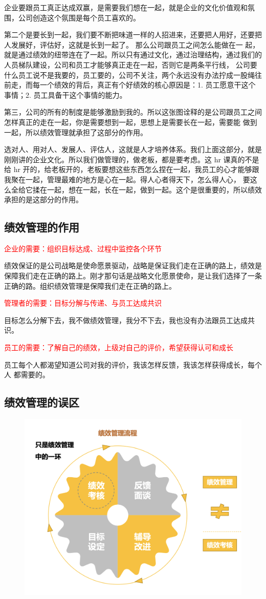 \documentclass[12pt]{article}
\begin{document}
企业要跟员工真正达成双赢，是需要我们想在一起，就是企业的文化价值观和氛围，公司创造这个氛围是每个员工喜欢的。

第二个是要长到一起，我们要不断把味道一样的人招进来，还要把人用好，还要把人发展好，评估好，这就是长到一起了。 那么公司跟员工之间怎么能做在一 起，就是通过绩效的纽带连在了一起。所以只有通过文化，通过治理结构，通过我们的人员梯队建设，公司和员工才能够真正走在一起，否则它是两条平行线， 公司要什么员工说不是我要的，员工要的，公司不关注，两个永远没有办法拧成一股绳往前走，而每一个绩效的背后，真正有个好绩效的核心原因是：1. 员工愿意干这个事情；2. 员工具备干这个事情的能力。

第三，公司的所有的制度是能够激励到我的。所以这张图诠释的是公司跟员工之间怎样真正的走在一起，你是需要想到一起，思想上是需要长在一起，需要能 做到一起，所以绩效管理就承担了这部分的作用。

选对人、用对人、发展人、评估人，这就是人才培养体系。我们上面这部分，就是刚刚讲的企业文化。所以我们做管理的，做老板，都是要考虑。这 hr 课真的不是给 hr 开的，给老板开的，老板要想这些东西怎么捏在一起，我员工的心才能够跟我聚在一起，管理最难的地方是心在一起。得人心者得天下，怎么得人心， 要这么全给它揉在一起，想在一起，长在一起，做到一起。这个是很重要的，所以绩效承担的是这部分的作用。

\subsection{绩效管理的作用}
\textcolor{red}{企业的需要：组织目标达成、过程中监控各个环节}

绩效保证的是公司战略是使命愿景驱动，战略是保证我们走在正确的路上，绩效是保障我们走在正确的路上。刚才那句话是战略文化愿景使命，是让我们选择了一条正确的路。组织绩效管理是保障我们走在正确的路上。

\textcolor{red}{管理者的需要：目标分解与传递、与员工达成共识}

目标怎么分解下去，我不做绩效管理，我分不下去，我也没有办法跟员工达成共识。

\textcolor{red}{员工的需要：了解自己的绩效，上级对自己的评价，希望获得认可和成长}

员工每个人都渴望知道公司对我的评价，我该怎样反馈，我该怎样获得成长，每个人 都需要的。

\subsection{绩效管理的误区}
\begin{figure}[H]
    \centering
    \includegraphics[width=.6\textwidth]{fig/Ali_Performance_2.png}
\end{figure}
\end{document}
